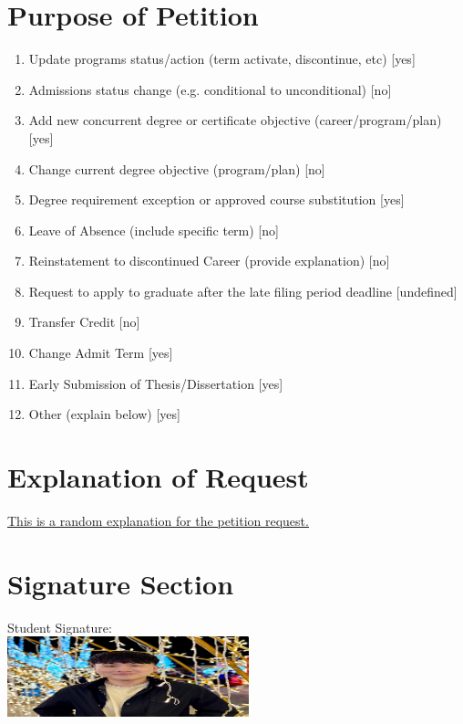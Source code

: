 \documentclass[a4paper,12pt]{article}
\begin{document}
    \section*{Purpose of Petition}
    \begin{enumerate}
        \item Update programs status/action (term activate, discontinue, etc) \hfill [yes]
        \item Admissions status change (e.g. conditional to unconditional) \hfill [no]
        \item Add new concurrent degree or certificate objective (career/program/plan) \hfill [yes]
        \item Change current degree objective (program/plan) \hfill [no]
        \item Degree requirement exception or approved course substitution \hfill [yes]
        \item Leave of Absence (include specific term) \hfill [no]
        \item Reinstatement to discontinued Career (provide explanation) \hfill [no]
        \item Request to apply to graduate after the late filing period deadline \hfill [undefined]
        \item Transfer Credit \hfill [no]
        \item Change Admit Term \hfill [yes]
        \item Early Submission of Thesis/Dissertation \hfill [yes]
        \item Other (explain below) \hfill [yes]
    \end{enumerate}
    
    \section*{Explanation of Request}
    \begin{flushleft}
    \underline{\hspace{15cm} This is a random explanation for the petition request.} \\
    \end{flushleft}
    
    \section*{Signature Section}
    Student Signature: \\
    \includegraphics[width=7cm]{signature.png}
    
    
\end{document}
